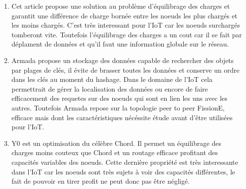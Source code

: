 \documentclass{article}
\begin{document}
\begin{enumerate}
	\item\cite{Chawachat:2015:SLA:2885370.2885376}Cet article propose une solution au problème d'équilibrage des charges et garantit une différence de charge bornée entre les noeuds les plus chargés et les moins chargés. C'est très interessant pour l'IoT car les noeuds surchargés tomberont vite. Toutefois l'équilibrage des charges
	a un cout car il se fait par déplament de données et qu'il faut une information globale sur le réseau.

	\item\cite{4527242}Armada propose un stockage des données capable de rechercher des objets par plages de clés, il évite de brasser toutes les données et conserve un ordre dans les clés au moment du hashage. Dans le domaine
	de l'IoT cela permettrait de gérer la localisation des données ou encore de faire efficacement des requetes sur
	des noeuds qui sont en lien les uns avec les autres. Toutefois Armada repose sur la topologie peer to peer FissionE, efficace mais dont les caractéristiques nécéssite étude avant d'être utilisées pour l'IoT.

	\item\cite{1497926}Y0 est un optimisation du célèbre Chord. Il permet un équilibrage des charges moins couteux
	que Chord et un routage efficace profitant des capacités variables des noeuds. Cette dernière propriété est très interessante dans l'IoT car les noeuds sont très sujets à voir des capacités différentes, le fait de pouvoir en tirer profit ne peut donc pas être négligé.

\end{enumerate}
\end{document}
